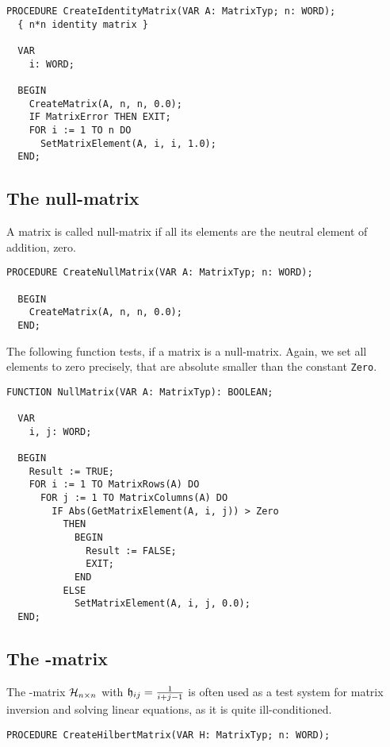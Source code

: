 \begin{refsection}
\begin{lstlisting}[caption=identity matrix]
  PROCEDURE CreateIdentityMatrix(VAR A: MatrixTyp; n: WORD);
  { n*n identity matrix }

  VAR
    i: WORD;

  BEGIN
    CreateMatrix(A, n, n, 0.0);
    IF MatrixError THEN EXIT;
    FOR i := 1 TO n DO
      SetMatrixElement(A, i, i, 1.0);
  END;
\end{lstlisting}

\subsection{The null-matrix}

A matrix  is called null-matrix if all its elements are the neutral element of addition, zero. 

\begin{lstlisting}[caption=null matrix]
  PROCEDURE CreateNullMatrix(VAR A: MatrixTyp; n: WORD);

  BEGIN
    CreateMatrix(A, n, n, 0.0);
  END;
\end{lstlisting}

The following function tests, if a matrix is a null-matrix. Again, we set all elements to zero precisely, that are absolute smaller than the constant \texttt{Zero}.

\begin{lstlisting}[caption=are all matrix matrix elements zero?]
  FUNCTION NullMatrix(VAR A: MatrixTyp): BOOLEAN;

  VAR
    i, j: WORD;

  BEGIN
    Result := TRUE;
    FOR i := 1 TO MatrixRows(A) DO
      FOR j := 1 TO MatrixColumns(A) DO
        IF Abs(GetMatrixElement(A, i, j)) > Zero
          THEN
            BEGIN
              Result := FALSE;
              EXIT;
            END
          ELSE
            SetMatrixElement(A, i, j, 0.0);
  END;
\end{lstlisting}

\subsection{The -matrix}

The -matrix \(\mathcal{H}_{n\times n} \) with \(\mathfrak{h}_{ij} = \frac{1}{i+j-1} \) is often used as a test system for matrix inversion and solving linear equations, as it is quite ill-conditioned.

\begin{lstlisting}[caption=Hilbert matrix]
  PROCEDURE CreateHilbertMatrix(VAR H: MatrixTyp; n: WORD);


\end{lstlisting}
\end{refsection}
